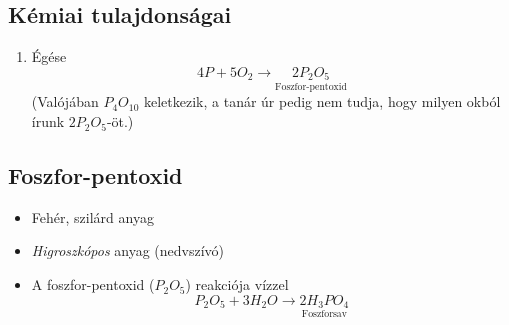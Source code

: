 \documentclass{article}
\begin{document}
    
    
    
    \subsection{Kémiai tulajdonságai}
    \begin{enumerate}
        \item Égése
        \[
        4P + 5O_2 \rightarrow \underset{\text{Foszfor-pentoxid}}{2P_2O_5}
        \]
        (Valójában $P_4O_{10}$ keletkezik, a tanár úr pedig nem tudja, hogy milyen okból írunk $2P_2O_5$-öt.)
    \end{enumerate}
    
    \subsection{Foszfor-pentoxid}
    \begin{itemize}
        \item Fehér, szilárd anyag
        \item \emph{Higroszkópos} anyag (nedvszívó)
        \item A foszfor-pentoxid ($P_2O_5$) reakciója vízzel
        \[
        P_2O_5 + 3H_2O \rightarrow \underset{\text{Foszforsav}}{2H_3PO_4}
        \]
    \end{itemize}
\end{document}
